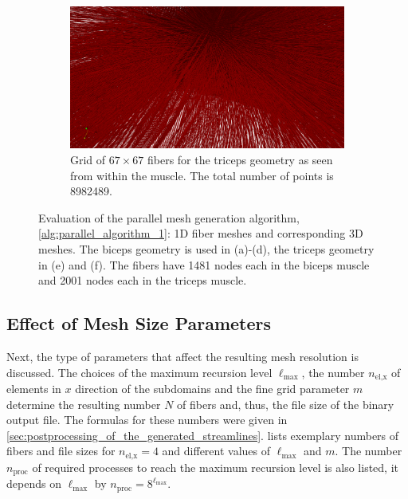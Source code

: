 \begin{figure}
  \hfill
  \begin{subfigure}[t]{0.55\textwidth}%
    \centering%
    \includegraphics[width=\textwidth]{images/parallel_fiber_estimation/triceps_inside_67x67c.png}
    \caption{Grid of $67 \times 67$ fibers for the triceps geometry as seen from within the muscle. The total number of points is \num{8982489}.}%
    \label{fig:muscle_mesh_4}%
  \end{subfigure}  
   
  \caption{Evaluation of the parallel mesh generation algorithm, \cref{alg:parallel_algorithm_1}: 1D fiber meshes and corresponding 3D meshes. The biceps geometry is used in (a)-(d), the triceps geometry in (e) and (f). The fibers have 1481 nodes each in the biceps muscle and 2001 nodes each in the triceps muscle.}%
  \label{fig:muscle_meshes}%
\end{figure}%

\subsection{Effect of Mesh Size Parameters}\label{sec:mesh_generation_mesh_size_parameters}

Next, the type of parameters that affect the resulting mesh resolution is discussed.
The choices of the maximum recursion level $\ell_\text{max}$, the number $n_\text{el,x}$ of elements in $x$ direction of the subdomains and the fine grid parameter $m$ determine the resulting number $N$ of fibers and, thus, the file size of the binary output file. The formulas for these numbers were given in \cref{sec:postprocessing_of_the_generated_streamlines}.  lists exemplary numbers of fibers and file sizes for $n_\text{el,x}=4$ and different values of $\ell_\text{max}$ and $m$. The number $n_\text{proc}$ of required processes to reach the maximum recursion level is also listed, it depends on $\ell_\text{max}$ by $n_\text{proc}=8^{\ell_\text{max}}$.

